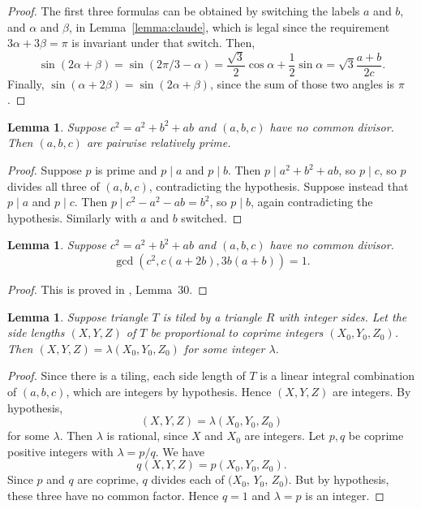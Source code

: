 \documentclass{amsart}
\theoremstyle{plain}
\newtheorem{lemma}[theorem]{Lemma}
\theoremstyle{definition}
\theoremstyle{remark}
\begin{document}
\begin{proof}
The first three formulas can be obtained by switching the labels $a$ and $b$, and $\alpha$ and $\beta$, in Lemma~\ref{lemma:claude}, 
which is legal since the requirement $3\alpha + 3\beta = \pi$ is invariant under that switch.  Then,
$$ \sin(2\alpha + \beta) = \sin(2\pi/3 -\alpha)= \frac{\sqrt 3} 2 \cos \alpha + \frac 1 2 \sin \alpha  = \sqrt 3 \frac {a+b}{2c}. $$
Finally, $\sin(\alpha+2\beta) = \sin(2\alpha+\beta)$, since the sum of those two angles is $\pi$.
\end{proof}

\begin{lemma} \label{lemma:pairwisecoprimality} Suppose $c^2 = a^2 + b^2 + ab$ and 
$(a,b,c)$ have no common divisor.  Then $(a,b,c)$ are pairwise relatively prime.
\end{lemma}
\begin{proof}  Suppose $p$ is prime and $p \mid a$ and $p \mid b$.  Then $p \mid a^2 + b^2 + ab$, so
$p \mid c$, so $p$ divides all three of $(a,b,c)$, contradicting the hypothesis.
  Suppose instead that $p \mid a$ and $p \mid c$.  Then $p \mid c^2 -a^2 - ab = b^2$,
so $p \mid b$, again contradicting the hypothesis.  Similarly with $a$ and $b$ switched. 
\end{proof}

\begin{lemma} \label{lemma:BLZ30} Suppose $c^2 = a^2 + b^2 + ab$ and 
$(a,b,c)$ have no common divisor. 
$$ \gcd(c^2,c(a+2b),3b(a+b)) = 1.$$
\end{lemma}

\begin{proof}  This is proved in \cite{BLZ2026}, Lemma~30.
\end{proof}

\begin{lemma} \label{lemma:claude3}
Suppose triangle $T$ is tiled by a triangle $R$ with integer sides.
 Let the side lengths 
$(X,Y,Z)$ of $T$ be proportional to coprime integers $(X_0, Y_0, Z_0)$.
Then $(X,Y,Z) = \lambda (X_0,Y_0,Z_0)$ for some integer $\lambda$.
\end{lemma}

\begin{proof} Since there is a tiling, each side length of $T$ is a 
linear integral combination of $(a,b,c)$, which are integers by 
hypothesis.  Hence $(X,Y,Z)$ are integers.  By hypothesis,
$$ (X,Y,Z) = \lambda (X_0,Y_0,Z_0)$$
for some $\lambda$.  Then $\lambda$ is rational, since $X$ and $X_0$
are integers.  Let $p,q$ be coprime positive integers with $\lambda = p/q$.
We have 
$$ q (X,Y,Z) = p (X_0,Y_0,Z_0).$$
Since $p$ and $q$ are coprime, $q$ divides each of $(X_0$, $Y_0$, $Z_0)$.  But 
by hypothesis, these three have no common factor.  Hence $q = 1$ and $\lambda = p$
is an integer. 
\end{proof}
\end{document}
